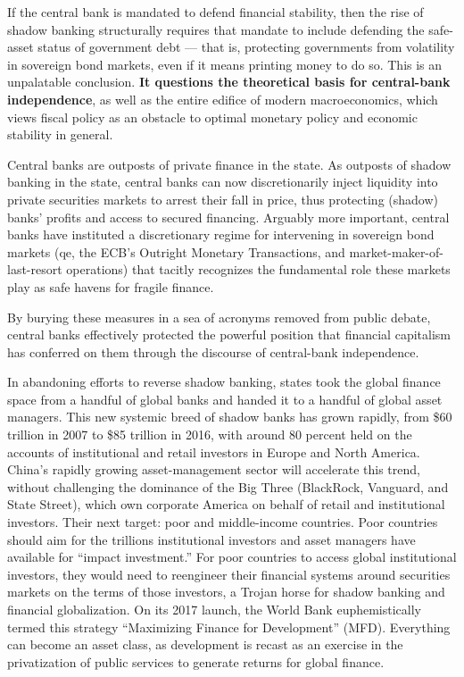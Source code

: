 \documentclass[
]{book}
\begin{document}
If the central bank is mandated to defend financial stability, then the rise of shadow banking structurally requires that mandate to include defending the safe-asset status of government debt --- that is, protecting governments from volatility in sovereign bond markets, even if it means printing money to do so. This is an unpalatable conclusion. \textbf{It questions the theoretical basis for central-bank independence}, as well as the entire edifice of modern macroeconomics, which views fiscal policy as an obstacle to optimal monetary policy and economic stability in general.

Central banks are outposts of private finance in the state. As outposts of shadow banking in the state, central banks can now discretionarily inject liquidity into private securities markets to arrest their fall in price, thus protecting (shadow) banks' profits and access to secured financing. Arguably more important, central banks have instituted a discretionary regime for intervening in sovereign bond markets (qe, the ECB's Outright Monetary Transactions, and market-maker-of-last-resort operations) that tacitly recognizes the fundamental role these markets play as safe havens for fragile finance.

By burying these measures in a sea of acronyms removed from public debate, central banks effectively protected the powerful position that financial capitalism has conferred on them through the discourse of central-bank independence.

In abandoning efforts to reverse shadow banking, states took the global finance space from a handful of global banks and handed it to a handful of global asset managers.
This new systemic breed of shadow banks has grown rapidly, from \$60 trillion in 2007 to \$85 trillion in 2016, with around 80 percent held on the accounts of institutional and retail investors in Europe and North America. China's rapidly growing asset-management sector will accelerate this trend, without challenging the dominance of the Big Three (BlackRock, Vanguard, and State Street), which own corporate America on behalf of retail and institutional investors. Their next target: poor and middle-income countries.
Poor countries should aim for the trillions institutional investors and asset managers have available for ``impact investment.''
For poor countries to access global institutional investors, they would need to reengineer their financial systems around securities markets on the terms of those investors, a Trojan horse for shadow banking and financial globalization.
On its 2017 launch, the World Bank euphemistically termed this strategy ``Maximizing Finance for Development'' (MFD).
Everything can become an asset class, as development is recast as an exercise in the privatization of public services to generate returns for global finance.
\end{document}
